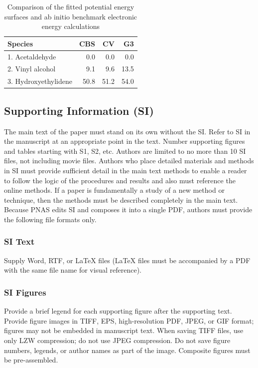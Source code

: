 \documentclass[9pt,twocolumn,twoside]{pnas-new}
\begin{document}
\begin{table}%
\centering
\caption{Comparison of the fitted potential energy surfaces and ab initio benchmark electronic energy calculations}
\begin{tabular}{lrrr}
Species & CBS & CV & G3 \\
\midrule
1. Acetaldehyde & 0.0 & 0.0 & 0.0 \\
2. Vinyl alcohol & 9.1 & 9.6 & 13.5 \\
3. Hydroxyethylidene & 50.8 & 51.2 & 54.0\\
\bottomrule
\end{tabular}

\end{table}

\subsection*{Supporting Information (SI)}

The main text of the paper must stand on its own without the SI. Refer to SI in the manuscript at an appropriate point in the text. Number supporting figures and tables starting with S1, S2, etc. Authors are limited to no more than 10 SI files, not including movie files. Authors who place detailed materials and methods in SI must provide sufficient detail in the main text methods to enable a reader to follow the logic of the procedures and results and also must reference the online methods. If a paper is fundamentally a study of a new method or technique, then the methods must be described completely in the main text. Because PNAS edits SI and composes it into a single PDF, authors must provide the following file formats only.

\subsubsection*{SI Text}

Supply Word, RTF, or LaTeX files (LaTeX files must be accompanied by a PDF with the same file name for visual reference).

\subsubsection*{SI Figures}

Provide a brief legend for each supporting figure after the supporting text. Provide figure images in TIFF, EPS, high-resolution PDF, JPEG, or GIF format; figures may not be embedded in manuscript text. When saving TIFF files, use only LZW compression; do not use JPEG compression. Do not save figure numbers, legends, or author names as part of the image. Composite figures must be pre-assembled.
\end{document}
